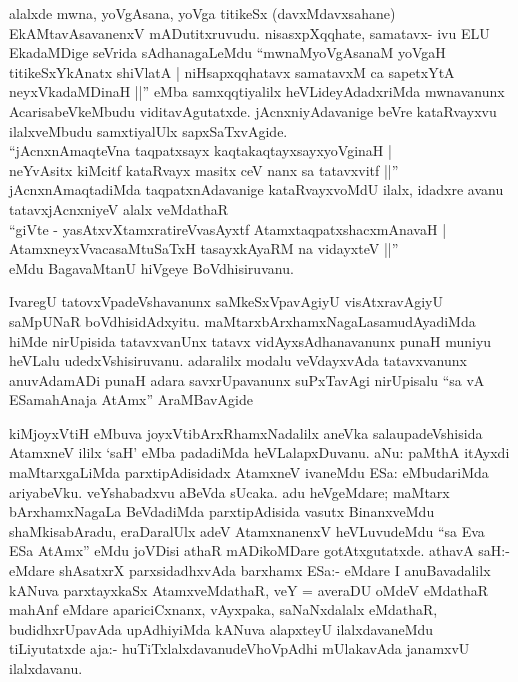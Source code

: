 \begin{artha}
alalxde mwna, yoVgAsana, yoVga titikeSx (davxMdavxsahane) EkAMtavAsavanenxV mADutitxruvudu. nisasxpXqqhate, samatavx- ivu ELU EkadaMDige seVrida sAdhanagaLeMdu ``mwnaMyoVgAsanaM yoVgaH titikeSxYkAnatx shiVlatA | niHsapxqqhatavx samatavxM ca sapetxYtA neyxVkadaMDinaH ||'' eMba samxqqtiyalilx heVLideyAdadxriMda mwnavanunx AcarisabeVkeMbudu viditavAgutatxde. jAcnxniyAdavanige beVre kataRvayxvu ilalxveMbudu samxtiyalUlx sapxSaTxvAgide. \\``jAcnxnAmaqteVna taqpatxsayx kaqtakaqtayxsayxyoVginaH |\\
neYvAsitx kiMcitf kataRvayx masitx ceV nanx sa tatavxvitf ||''\\ jAcnxnAmaqtadiMda taqpatxnAdavanige kataRvayxvoMdU ilalx, idadxre avanu tatavxjAcnxniyeV alalx veMdathaR \\``giVte - yasAtxvXtamxratireVvasAyxtf AtamxtaqpatxshacxmAnavaH |\\
AtamxneyxVvacasaMtuSaTxH tasayxkAyaRM na vidayxteV ||''\\ eMdu BagavaMtanU hiVgeye BoVdhisiruvanu.
\end{artha}

\begin{artha}
IvaregU tatovxVpadeVshavanunx saMkeSxVpavAgiyU visAtxra\-\break vAgiyU saMpUNaR boVdhisidAdxyitu. maMtarxbArxhamxNagaLa\break samudAyadiMda hiMde nirUpisida tatavxvanUnx tatavx vidAyxsAdhanavanunx punaH muniyu heVLalu udedxVshisiruvanu. adaralilx modalu veVdayxvAda tatavxvanunx anuvAdamADi punaH adara savxrUpavanunx suPxTavAgi nirUpisalu ``sa vA ESamahAnaja AtAmx'' AraMBavAgide
\end{artha}

\vishaya{}

\begin{artha}
kiMjoyxVtiH eMbuva joyxVtibArxRhamxNadalilx aneVka sala\break upadeVshisida AtamxneV ililx `saH' eMba padadiMda heVLalapxDuvanu. aNu: paMthA itAyxdi maMtarxgaLiMda parxtipAdisidadx AtamxneV ivaneMdu ESa: eMbudariMda ariyabeVku. veYshabadxvu aBeVda sUcaka. adu heVgeMdare; maMtarx bArxhamxNagaLa BeVdadiMda parxtipAdisida vasutx BinanxveMdu shaMkisabAradu, eraDaralUlx adeV AtamxnanenxV heVLuvudeMdu ``sa Eva ESa AtAmx'' eMdu joVDisi athaR mADikoMDare gotAtxgutatxde. athavA saH:- eMdare shAsatxrX parxsidadhxvAda barxhamx ESa:- eMdare I anuBavadalilx kANuva parxtayxkaSx AtamxveMdathaR, veY =  averaDU oMdeV eMdathaR mahAnf eMdare apariciCxnanx, vAyxpaka, saNaNxdalalx eMdathaR, budidhxrUpavAda upAdhiyiMda kANuva alapxteyU ilalxdavaneMdu tiLiyutatxde aja:- huTiTxlalxdavanu\break deVhoVpAdhi mUlakavAda janamxvU ilalxdavanu.
\end{artha}


